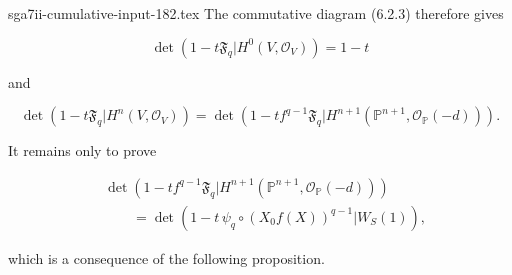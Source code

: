 \begin{filecontents*}{sga7ii-cumulative-input-182.tex}
The commutative diagram (6.2.3) therefore gives

\begin{equation}\tag{6.2.6}
\det\!\left(1-t\mathfrak F_q
\mathrel{\Big|}H^0(V,\mathcal O_V)\right)=1-t
\end{equation}

and

\begin{equation}\tag{6.2.7}
\det\!\left(1-t\mathfrak F_q
\mathrel{\Big|}H^n(V,\mathcal O_V)\right)
=
\det\!\left(
1-tf^{q-1}\mathfrak F_q
\mathrel{\Big|}
H^{n+1}(\mathbb P^{n+1},\mathcal O_{\mathbb P}(-d))
\right).
\end{equation}

It remains only to prove

\begin{equation}\tag{6.2.8}
\begin{aligned}
&\det\!\left(
1-tf^{q-1}\mathfrak F_q
\mathrel{\Big|}
H^{n+1}(\mathbb P^{n+1},\mathcal O_{\mathbb P}(-d))
\right)\\
&\qquad=
\det\!\left(
1-t\,\psi_q\circ(X_0f(X))^{q-1}
\mathrel{\Big|}W_S(1)
\right),
\end{aligned}
\end{equation}

which is a consequence of the following proposition.

\end{filecontents*}
